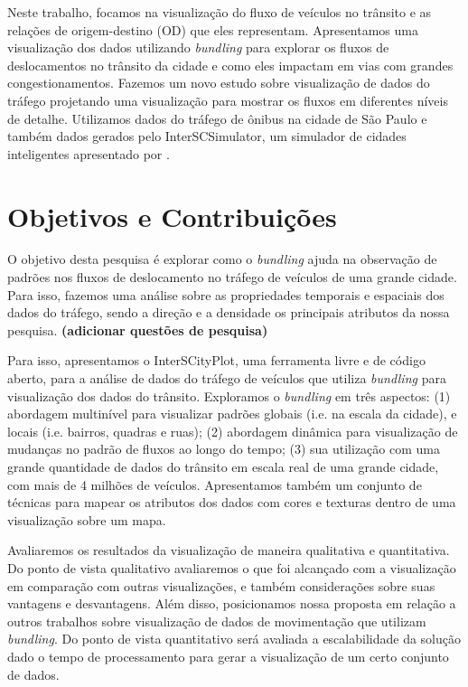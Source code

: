   Neste trabalho, focamos na visualização do fluxo de veículos no trânsito e as
relações de origem-destino (OD) que eles representam. Apresentamos uma
visualização dos dados utilizando \emph{bundling} para explorar os fluxos de
deslocamentos no trânsito da cidade e como eles impactam em vias com grandes
congestionamentos. Fazemos um novo estudo sobre visualização de dados do
tráfego projetando uma visualização para mostrar os fluxos em diferentes níveis
de detalhe. Utilizamos dados do tráfego de ônibus na cidade de São Paulo e
também dados gerados pelo InterSCSimulator, um simulador de cidades
inteligentes apresentado por \citet{mabs2017}.

\section{Objetivos e Contribuições}
  O objetivo desta pesquisa é explorar como o \emph{bundling} ajuda na
observação de padrões nos fluxos de deslocamento no tráfego de veículos de uma
grande cidade. Para isso, fazemos uma análise sobre as propriedades temporais e
espaciais dos dados do tráfego, sendo a direção e a densidade os principais
atributos da nossa pesquisa. \textbf{(adicionar questões de pesquisa)}

 Para isso, apresentamos o InterSCityPlot, uma ferramenta livre e de código
aberto, para a análise de dados do tráfego de veículos que utiliza
\emph{bundling} para visualização dos dados do trânsito.  Exploramos o
\emph{bundling} em três aspectos: (1) abordagem multinível para visualizar
padrões globais (i.e. na escala da cidade), e locais (i.e. bairros, quadras e
ruas); (2) abordagem dinâmica para visualização de mudanças no padrão de fluxos
ao longo do tempo; (3) sua utilização com uma grande quantidade de dados do
trânsito em escala real de uma grande cidade, com mais de 4 milhões de
veículos.  Apresentamos também um conjunto de técnicas para mapear os atributos
dos dados com cores e texturas dentro de uma visualização sobre um mapa.

  Avaliaremos os resultados da visualização de maneira qualitativa e
quantitativa. Do ponto de vista qualitativo avaliaremos o que foi alcançado com
a visualização em comparação com outras visualizações, e também considerações
sobre suas vantagens e desvantagens. Além disso, posicionamos nossa proposta em
relação a outros trabalhos sobre visualização de dados de movimentação que
utilizam \emph{bundling}. Do ponto de vista quantitativo será avaliada a
escalabilidade da solução dado o tempo de processamento para gerar a
visualização de um certo conjunto de dados.

